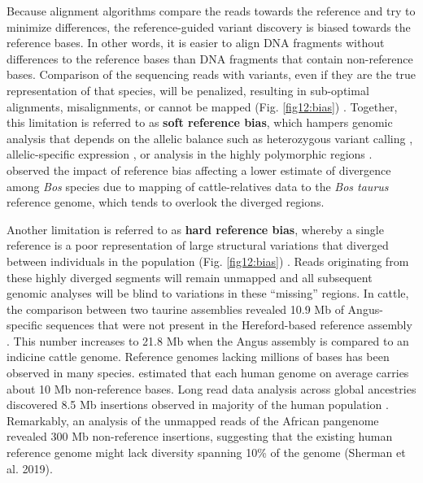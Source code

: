 \documentclass[../main.tex]{subfiles}
\begin{document}
Because alignment algorithms compare the reads towards the reference and try to minimize differences, the reference-guided variant discovery is biased towards the reference bases. In other words, it is easier to align DNA fragments without differences to the reference bases than DNA fragments  that contain non-reference bases. Comparison of the sequencing reads with variants, even if they are the true representation of that species, will be penalized, resulting in sub-optimal alignments, misalignments, or cannot be mapped (Fig. \ref{fig12:bias}) \citep{pritt2018forge}. Together, this limitation is referred to as \textbf{soft reference bias}, which hampers genomic analysis that depends on the allelic balance such as heterozygous variant calling \citep{garrison2018variation}, allelic-specific expression \citep{salavati2019elimination}, or analysis in the highly polymorphic regions \citep{dilthey2015improved}. \citet{wu2018pervasive} observed the impact of reference bias affecting a lower estimate of divergence among\emph{ Bos} species due to mapping of cattle-relatives data to the \emph{Bos taurus} reference genome, which tends to overlook the diverged regions. 

Another limitation is referred to as \textbf{hard reference bias}, whereby a single reference is a poor representation of large structural variations that diverged between individuals in the population (Fig. \ref{fig12:bias}) \citep{colquhoun2020nucleotide}. Reads originating from these highly diverged segments will remain unmapped and all subsequent genomic analyses will be blind to variations in these “missing” regions. In cattle, the comparison between two taurine assemblies revealed 10.9 Mb of Angus-specific sequences that were not present in the Hereford-based reference assembly \citep{Low2020}. This number increases to 21.8 Mb when the Angus assembly is compared to an indicine cattle genome. Reference genomes lacking millions of bases has been observed in many species. \citet{ameur2018novo,audano2019characterizing} estimated that each human genome on average carries about 10 Mb non-reference bases. Long read data analysis across global ancestries discovered 8.5 Mb insertions observed in majority of the human population \citep{audano2019characterizing}. Remarkably, an analysis of the unmapped reads of the African pangenome revealed 300 Mb non-reference insertions, suggesting that the existing human reference genome might lack diversity spanning 10\% of the genome (Sherman et al. 2019). \\
\end{document}
